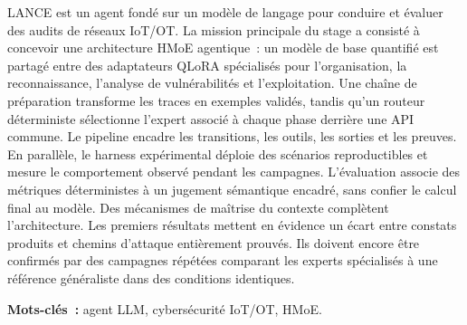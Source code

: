 LANCE est un agent fondé sur un modèle de langage pour conduire et évaluer des
audits de réseaux IoT/OT. La mission principale du stage a consisté à concevoir
une architecture HMoE agentique~: un modèle de base quantifié est partagé entre
des adaptateurs QLoRA spécialisés pour l'organisation, la reconnaissance,
l'analyse de vulnérabilités et l'exploitation. Une chaîne de préparation
transforme les traces en exemples validés, tandis qu'un routeur déterministe
sélectionne l'expert associé à chaque phase derrière une API commune. Le
pipeline encadre les transitions, les outils, les sorties et les preuves. En
parallèle, le harness expérimental déploie des scénarios reproductibles et mesure
le comportement observé pendant les campagnes. L'évaluation associe des
métriques déterministes à un jugement sémantique encadré, sans confier le calcul
final au modèle. Des mécanismes de maîtrise du contexte complètent
l'architecture. Les premiers résultats
mettent en évidence un écart entre constats produits et chemins d'attaque
entièrement prouvés. Ils doivent encore être confirmés par des campagnes répétées
comparant les experts spécialisés à une référence généraliste dans des
conditions identiques.

\vspace{1em}
\noindent\textbf{Mots-clés~:} agent LLM, cybersécurité IoT/OT, HMoE.
